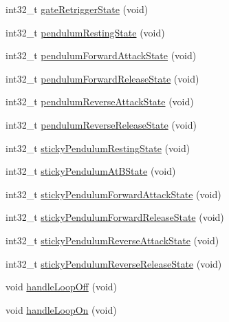 \begin{DoxyCompactItemize}
\item 
int32\+\_\+t \mbox{\hyperlink{class_meta_controller_aed970942a999d6877cc25908111d8d86}{gate\+Retrigger\+State}} (void)
\item 
int32\+\_\+t \mbox{\hyperlink{class_meta_controller_aa23c5bdc67442973a0bbcec0448ce6b1}{pendulum\+Resting\+State}} (void)
\item 
int32\+\_\+t \mbox{\hyperlink{class_meta_controller_abf6bdd57f10954b720d7ffa022b9a153}{pendulum\+Forward\+Attack\+State}} (void)
\item 
int32\+\_\+t \mbox{\hyperlink{class_meta_controller_ae19cd919a5c011b6f8d92db018e12ab5}{pendulum\+Forward\+Release\+State}} (void)
\item 
int32\+\_\+t \mbox{\hyperlink{class_meta_controller_a4a36b6e78f12343efa97f78f62a84961}{pendulum\+Reverse\+Attack\+State}} (void)
\item 
int32\+\_\+t \mbox{\hyperlink{class_meta_controller_ac0dfd31e6a44435ad874cf6cf9ce6cb9}{pendulum\+Reverse\+Release\+State}} (void)
\item 
int32\+\_\+t \mbox{\hyperlink{class_meta_controller_aa2d483666f462cd7463359e01884b0ed}{sticky\+Pendulum\+Resting\+State}} (void)
\item 
int32\+\_\+t \mbox{\hyperlink{class_meta_controller_a9d1d5e1874af5aaa313de79f8eda8ab8}{sticky\+Pendulum\+At\+B\+State}} (void)
\item 
int32\+\_\+t \mbox{\hyperlink{class_meta_controller_a93afa53f78656a0796a5e4b1fd3ced39}{sticky\+Pendulum\+Forward\+Attack\+State}} (void)
\item 
int32\+\_\+t \mbox{\hyperlink{class_meta_controller_a5acfa8ab673a41895e112430b0d49806}{sticky\+Pendulum\+Forward\+Release\+State}} (void)
\item 
int32\+\_\+t \mbox{\hyperlink{class_meta_controller_aa2b6e015a980cb21d1ab081cf860d9ca}{sticky\+Pendulum\+Reverse\+Attack\+State}} (void)
\item 
int32\+\_\+t \mbox{\hyperlink{class_meta_controller_a68d06e87f408205ffee85cab3560b54a}{sticky\+Pendulum\+Reverse\+Release\+State}} (void)
\item 
void \mbox{\hyperlink{class_meta_controller_aa585d038b9fdfab1eb5fff6e353b7ebe}{handle\+Loop\+Off}} (void)
\item 
void \mbox{\hyperlink{class_meta_controller_a52054c11063311316152e195a8982cd0}{handle\+Loop\+On}} (void)
\end{DoxyCompactItemize}
